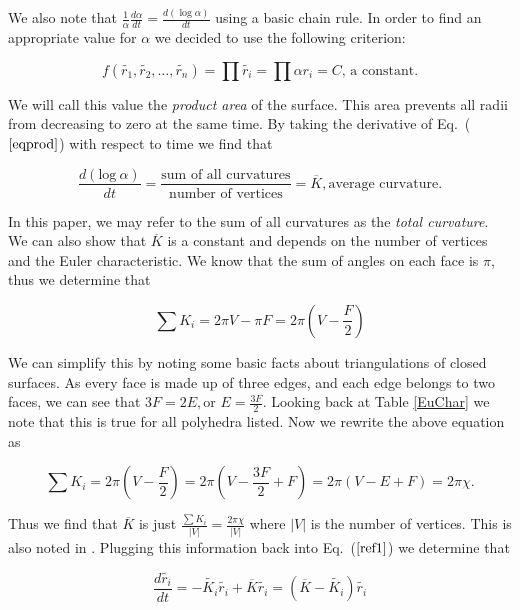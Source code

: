 \documentclass[12pt]{article}
\begin{document}
\noindent We also note that $\displaystyle \frac{1}{\alpha} \frac{d\alpha}{dt} = \frac{d(\log \alpha)}{dt}$ using a basic chain rule. In order to find an appropriate value for $\alpha$ we decided to use the following criterion:
 
\begin{equation}
\label{eqprod}
f(\tilde{r_1},\tilde{r_2},\ldots,\tilde{r_n}) = \prod{\tilde{r_i}} = \prod{\alpha r_i} = C\mbox{, a constant.}
\end{equation}

\noindent We will call this value the \textit{product area} of the surface. This area prevents all radii from decreasing to zero at the same time. By taking the derivative of Eq.~($\ref{eqprod}$) with respect to time we find that 
 
\begin{equation}
\label{proof1}
\frac{d(\mbox{log}~\alpha)}{dt} = \frac{\mbox{sum of all curvatures}}{\mbox{number of vertices}} = \overline{K}, \mbox{average curvature.}
\end{equation}

\noindent In this paper, we may refer to the sum of all curvatures as the \textit{total curvature}. We can also show that $\overline{K}$ is a constant and depends on the number of vertices and the Euler characteristic. We know that the sum of angles on each face is $\pi$, thus we determine that 

$$\sum{K_i} = 2\pi V - \pi F = 2\pi(V - \frac{F}{2})$$

\noindent We can simplify this by noting some basic facts about triangulations of closed surfaces. As every face is made up of three edges, and each edge belongs to two faces, we can see that $3F = 2E, \mbox{or } E = \frac{3F}{2}$. Looking back at Table \ref{EuChar} we note that this is true for all polyhedra listed. Now we rewrite the above equation as

$$\sum{K_i} = 2\pi(V - \frac{F}{2}) = 2\pi(V - \frac{3F}{2} + F) = 2\pi(V - E + F) = 2\pi \chi.$$

\noindent Thus we find that $\overline{K}$ is just $\displaystyle\frac{\sum{K_i}}{|V|} = \frac{2\pi \chi}{|V|}$ where $|V|$ is the number of vertices. This is also noted in \cite{chowluo}. Plugging this information back into Eq.~($\ref{ref1}$) we determine that

\begin{equation}
\frac{d\tilde{r_i}}{dt} = -\tilde{K_i}\tilde{r_i} + \overline{K}\tilde{r_i} = (\overline{K} - \tilde{K_i})\tilde{r_i}
\end{equation}
\end{document}

